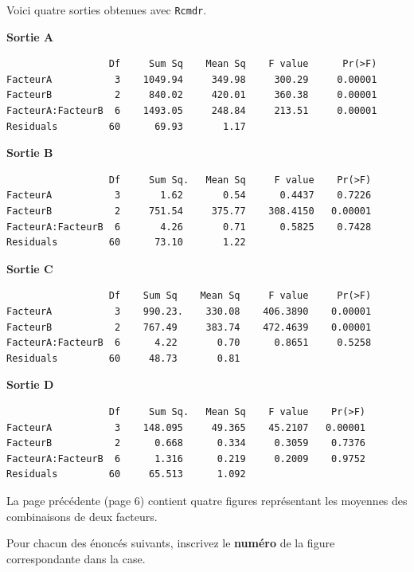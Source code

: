\begin{questions}
 


\newpage
\question

Voici quatre sorties obtenues avec \texttt{Rcmdr}.

\smallskip
{\bf Sortie A}
\begin{verbatim}
                  Df     Sum Sq    Mean Sq    F value      Pr(>F)    
FacteurA           3    1049.94     349.98     300.29     0.00001 
FacteurB           2     840.02     420.01     360.38     0.00001 
FacteurA:FacteurB  6    1493.05     248.84     213.51     0.00001 
Residuals         60      69.93       1.17                           
\end{verbatim}

{\bf Sortie B}
\begin{verbatim}
                  Df     Sum Sq.   Mean Sq     F value    Pr(>F)    
FacteurA           3       1.62       0.54      0.4437    0.7226    
FacteurB           2     751.54     375.77    308.4150   0.00001
FacteurA:FacteurB  6       4.26       0.71      0.5825    0.7428    
Residuals         60      73.10       1.22                         
\end{verbatim}


{\bf Sortie C}
\begin{verbatim}
                  Df    Sum Sq    Mean Sq     F value     Pr(>F)    
FacteurA           3    990.23.    330.08    406.3890    0.00001
FacteurB           2    767.49     383.74    472.4639    0.00001
FacteurA:FacteurB  6      4.22       0.70      0.8651     0.5258    
Residuals         60     48.73       0.81               
\end{verbatim}

{\bf Sortie D}
\begin{verbatim}
                  Df     Sum Sq.   Mean Sq    F value    Pr(>F)    
FacteurA           3    148.095     49.365    45.2107   0.00001
FacteurB           2      0.668      0.334     0.3059    0.7376    
FacteurA:FacteurB  6      1.316      0.219     0.2009    0.9752    
Residuals         60     65.513      1.092                        
\end{verbatim}
La page précédente (page 6) contient quatre figures représentant les moyennes des combinaisons de deux facteurs.


Pour chacun des énoncés suivants, inscrivez le \textbf{numéro} de la figure correspondante dans la case.
\end{questions}
